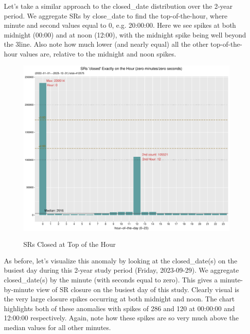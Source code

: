 \documentclass[12pt, titlepage]{article}
\begin{document}
{	Let's take a similar approach to the closed\_date distribution over the 2-year period. We aggregate 
	SRs by close\_date to find the top-of-the-hour, where minute and second values equal to 0, e.g. 20:00:00. 
	Here we see spikes at both midnight (00:00) and at noon (12:00), with the midnight spike being 
	well beyond the 3\textsigma line. Also note how much lower (and nearly equal) all the other
	top-of-the-hour values are, relative to the midnight and noon spikes. 
	
	\begin{figure}[tbp]
		 \centering
		 \caption{SRs Closed at Top of the Hour}
		 \includegraphics[width = \textwidth]{SR_closed_by_top_of_hour.pdf}
		 \label{fig:tophourclosed}
	\end{figure}
	
	As before, let's visualize this anomaly by looking at the closed\_date(s) on the busiest day
	during this 2-year study period (Friday, 2023-09-29). We aggregate closed\_date(s) by the
	minute (with seconds equal to zero). This gives a minute-by-minute view of SR closure
	on the busiest day of this study. Clearly visual is the very large closure spikes occurring
	at both midnight and noon. The chart highlights both of these anomalies with spikes
	of 286 and 120 at 00:00:00 and 12:00:00 respectively. Again, note how these spikes
	are so very much above the median values for all other minutes.

}
\end{document}
